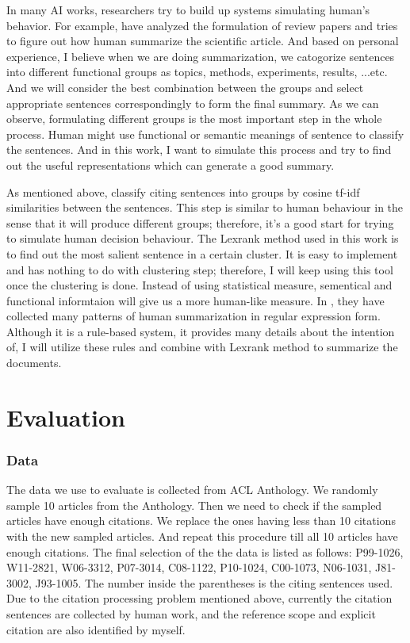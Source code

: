 \documentclass[hyp]{socreport}
\begin{document}
In many AI works, researchers try to build up systems simulating human's behavior. For example, \citep{kokil2010} have analyzed the formulation of review papers and tries to figure out how human summarize the scientific article. And based on personal experience, I believe when we are doing summarization, we catogorize sentences into different functional groups as topics, methods, experiments, results, ...etc. And we will consider the best combination between the groups and select appropriate sentences correspondingly to form the final summary. As we can observe, formulating different groups is the most important step in the whole process. Human might use functional or semantic meanings of sentence to classify the sentences. And in this work, I want to simulate this process and try to find out the useful representations which can generate a good summary.

As mentioned above, \citep{qazvinian2008} classify citing sentences into groups by cosine tf-idf similarities between the sentences. This step is similar to human behaviour in the sense that it will produce different groups; therefore, it's a good start for trying to simulate human decision behaviour. The Lexrank method used in this work is to find out the most salient sentence in a certain cluster. It is easy to implement and has nothing to do with clustering step; therefore, I will keep using this tool once the clustering is done. Instead of using statistical measure, sementical and functional informtaion will give us a more human-like measure. In \citep{kokil2010}, they have collected many patterns of human summarization in regular expression form. Although it is a rule-based system, it provides many details about the intention of, I will utilize these rules and combine with Lexrank method to summarize the documents.


\section{Evaluation}

\subsubsection{Data}

The data we use to evaluate is collected from ACL Anthology. We randomly sample 10 articles from the Anthology. Then we need to check if the sampled articles have enough citations. We replace the ones having less than 10 citations with the new sampled articles. And repeat this procedure till all 10 articles have enough citations. The final selection of the the data is listed as follows:  P99-1026, W11-2821, W06-3312,  P07-3014,  C08-1122,  P10-1024, C00-1073, N06-1031, J81-3002, J93-1005. The number inside the parentheses is the citing sentences used. Due to the citation processing problem mentioned above, currently the citation sentences are collected by human work, and the reference scope and explicit citation are also identified by myself.   
 
\end{document}
